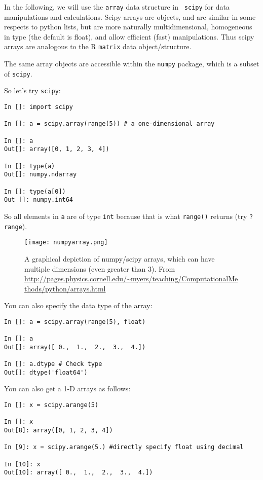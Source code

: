 In the following, we will use the {\tt array} data structure in {\tt 
scipy} for data manipulations and calculations. Scipy arrays are 
objects, and are similar in some respects to python lists, but are more 
naturally multidimensional, homogeneous in type (the default is float), 
and allow efficient (fast) manipulations. Thus scipy arrays are 
analogous to the R {\tt matrix} data object/structure. 

\begin{tipbox}
	The same array objects are accessible within the {\tt numpy} package, which 
is a subset of {\tt scipy}.
\end{tipbox}

So let's try {\tt scipy}:
 \begin{lstlisting}
In []: import scipy

In []: a = scipy.array(range(5)) # a one-dimensional array

In []: a
Out[]: array([0, 1, 2, 3, 4])

In []: type(a)
Out[]: numpy.ndarray

In []: type(a[0])
Out []: numpy.int64
\end{lstlisting}

So all elements in {\tt a} are of type {\tt int} because that is what 
{\tt range()} returns (try {\tt ?range}).

\begin{figure}[H] \centering
    \texttt{[image: numpyarray.png]}
	\caption{A graphical depiction of numpy/scipy arrays, which can have 
	multiple dimensions (even greater than 3). From 
	\url{http://pages.physics.cornell.edu/~myers/teaching/ComputationalMethods/python/arrays.html}}
\end{figure}

You can also specify the data type of the array:

\begin{lstlisting}
In []: a = scipy.array(range(5), float)

In []: a
Out[]: array([ 0.,  1.,  2.,  3.,  4.])

In []: a.dtype # Check type 
Out[]: dtype('float64')
\end{lstlisting}

You can also get a 1-D arrays as follows: 
\begin{lstlisting}
In []: x = scipy.arange(5)

In []: x
Out[8]: array([0, 1, 2, 3, 4])

In [9]: x = scipy.arange(5.) #directly specify float using decimal

In [10]: x
Out[10]: array([ 0.,  1.,  2.,  3.,  4.])
\end{lstlisting}

